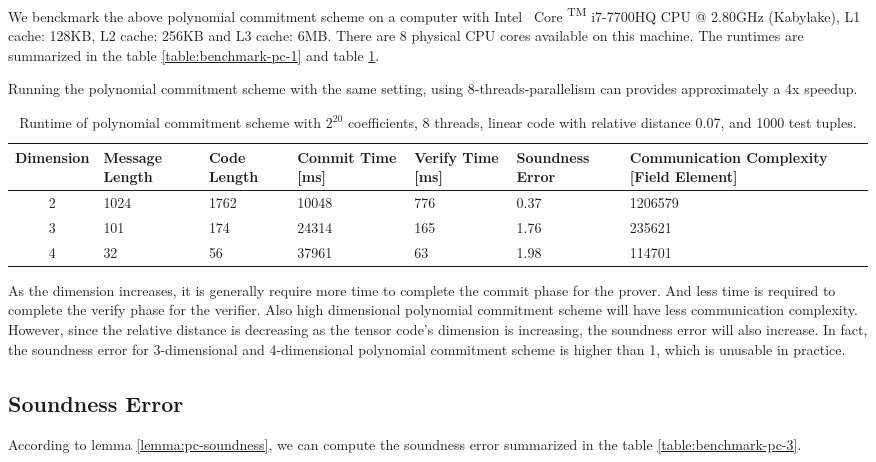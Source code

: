 We benckmark the above polynomial commitment scheme on a computer with
Intel \textregistered \, Core  \textsuperscript{TM} i7-7700HQ CPU @ 2.80GHz (Kabylake), L1 cache: 128KB, L2 cache: 256KB and L3 cache: 6MB. There are 8 physical CPU cores available on this machine. The runtimes are summarized in the table \ref{table:benchmark-pc-1} and table \ref{table:benchmark-pc-2}.


Running the polynomial commitment scheme with the same setting, using 8-threads-parallelism can provides approximately a 4x speedup.

\begin{table}[h!]
\centering
\begin{tabular}{| c | m{4em}  | m{3em}  | m{3.5em} | m{2.5em} | m{5em} | m{7em} |} 
 \hline
 Dimension & Message Length & Code Length & Commit Time [ms] & Verify Time [ms] & Soundness Error & Communication Complexity [Field Element] \\ [0.5ex] 
 \hline\hline
 2 & 1024   & 1762 & 10048 & 776 & 0.37 & 1206579  \\
 \hline
 3 & 101    & 174 & 24314 & 165 & 1.76 & 235621 \\
 \hline
 4 & 32     & 56 & 37961 & 63 & 1.98 & 114701  \\ 
 \hline
\end{tabular}
\caption{Runtime of polynomial commitment scheme with $2^{20}$ coefficients, 8 threads, linear code with relative distance 0.07, and 1000 test tuples.}
\label{table:benchmark-pc-2}
\end{table}


As the dimension increases, it is generally require more time to complete the commit phase for the prover. And less time is required to complete the verify phase for the verifier. Also high dimensional polynomial commitment scheme will have less communication complexity. However, since the relative distance is decreasing as the tensor code's dimension is increasing, the soundness error will also increase. In fact, the soundness error for 3-dimensional and 4-dimensional polynomial commitment scheme is higher than 1, which is unusable in practice.

\subsection{Soundness Error}

According to lemma \ref{lemma:pc-soundness}, we can compute the soundness error summarized in the table \ref{table:benchmark-pc-3}.

